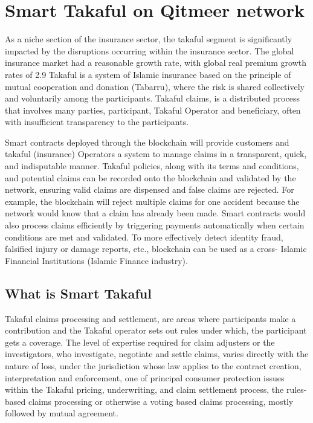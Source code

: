 \documentclass[a4paper,11pt]{article}
\begin{document}
\section{Smart Takaful on Qitmeer network}

As a niche section of the insurance sector, the takaful segment is significantly impacted by the disruptions occurring within the insurance sector. The global insurance market had a reasonable growth rate, with global real premium growth rates of 2.9%
Takaful is a system of Islamic insurance based on the principle of mutual cooperation and donation (Tabarru), where the risk is shared collectively and voluntarily among the participants. Takaful claims, is a distributed process that involves many parties, participant, Takaful Operator and beneficiary, often with insufficient transparency to the participants. 

Smart contracts deployed through the blockchain will provide customers and takaful (insurance) Operators a system to manage claims in a transparent, quick, and indisputable manner. Takaful policies, along with its terms and conditions, and potential claims can be recorded onto the blockchain and validated by the network, ensuring valid claims are dispensed and false claims are rejected.  For example, the blockchain will reject multiple claims for one accident because the network would know that a claim has already been made. Smart contracts would also process claims efficiently by triggering payments automatically when certain conditions are met and validated. To more effectively detect identity fraud, falsified injury or damage reports, etc., blockchain can be used as a cross- Islamic Financial Institutions (Islamic Finance industry).

\subsection{What is Smart Takaful}

Takaful claims processing and settlement, are areas where participants make a contribution and the Takaful operator sets out rules under which, the participant gets a coverage. The level of expertise required for claim adjusters or the investigators, who investigate, negotiate and settle claims, varies directly with the nature of loss, under the jurisdiction whose law applies to the contract creation, interpretation and enforcement, one of principal consumer protection issues within the Takaful pricing, underwriting, and claim settlement process, the rules-based claims processing or otherwise a voting based claims processing, mostly followed by mutual agreement. 
\end{document}
